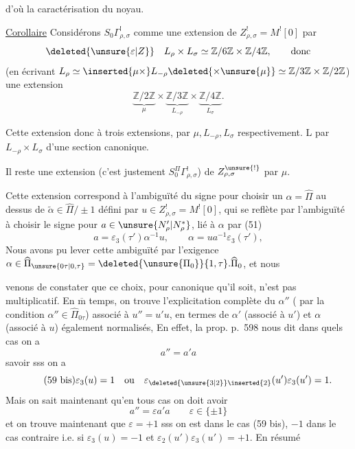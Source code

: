 
d'où la caractérisation du noyau.

\uline{Corollaire} Considérons  $S_0\Gamma^!_{\rho,\sigma}$ comme une extension de $Z^!_{\rho,\sigma}=M^![0]$ par
\[
\deleted{\unsure{\varepsilon|Z}}\quad
L_\rho\times L_\sigma\simeq\mathbb Z/6\mathbb Z\times\mathbb Z/4\mathbb Z,
\qquad\text{donc}
\]
(en écrivant $L_\rho\simeq\inserted{\mu\times}L_{-\rho}\deleted{\times\unsure{\mu}}\simeq\mathbb Z/3\mathbb Z\times\mathbb Z/2\mathbb Z$)
une extension 
\[
\underbrace{\mathbb Z/2\mathbb Z}_{\mu}\times
\underbrace{\mathbb Z/3\mathbb Z}_{L_{-\rho}}\times
\underbrace{\mathbb Z/4\mathbb Z}_{L_\sigma}.
\]


Cette extension  donc  à trois extensions, par $\mu,L_{-\rho},L_\sigma$ respectivement. L par $L_{-\rho}\times L_\sigma$   d'une section canonique.

Il reste une extension (c'est justement $S_0^\Pi\Gamma^!_{\rho,\sigma}$) de $Z^{\unsure{!}}_{\rho,\sigma}$ par $\mu$.

Cette extension correspond  à l'ambiguïté du signe pour choisir un $\alpha=\widehat\Pi$ au dessus de $\widetilde\alpha\in\widehat\Pi/\pm1$ défini par $u\in Z^!_{\rho,\sigma}=M^![0]$, qui se reflète par l'ambiguïté à choisir le signe pour $a\in\unsure{N'_\rho|N_\rho^*}$, lié à $\alpha$ par (51)
\[
\tag{58}
a=\varepsilon_3(\tau')\alpha^{-1}u,
\qquad \alpha=ua^{-1}\varepsilon_3(\tau'),
\]
Nous avons pu lever cette ambiguïté par l'exigence
$\alpha\in\widehat\Pi_{\unsure{0\tau|0,\tau}}=\deleted{\unsure{\Pi_0}}\{1,\tau\}.\widehat\Pi_0$, et nous



venons de constater que ce choix, pour canonique qu'il soit, n'est pas multiplicatif. En $\overline{\mathrm m}$ temps, on trouve l'explicitation complète du $\alpha''$ (  par la condition $\alpha''\in\widehat\Pi_{0\tau}$) associé à $u''=u'u$, en termes de $\alpha'$ (associé à $u'$) et $\alpha$ (associé à $u$) également normalisés,  En effet, la prop. p.\ 598 nous dit dans quels cas  on a
\[
\tag{59} a''=a'a
\]
savoir sss on a
\[
\tag{59 bis}
\varepsilon_3(u)=1\quad\text{ou}\quad
\varepsilon_{\deleted{\unsure{3|2}}\inserted{2}}(u')\varepsilon_3(u')=1.
\]
Mais on sait maintenant qu'en tous cas on doit avoir
\[
\tag{60}
a''=\varepsilon a'a\qquad \varepsilon\in\{\pm1\}
\]
et on trouve maintenant que $\varepsilon=+1$ sss on est dans le cas (59 bis), $-1$ dans le cas contraire i.e. si $\varepsilon_3(u)=-1$ et $\varepsilon_2(u')\varepsilon_3(u')=+1$. En résumé

